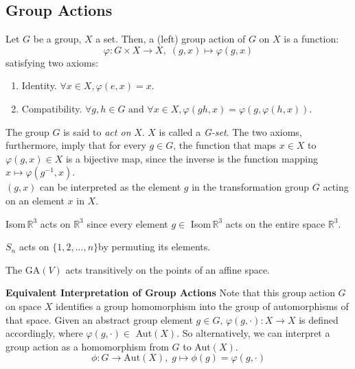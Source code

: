 \documentclass{article}
\begin{document}
  \subsection{Group Actions}

    \begin{definition}
      Let $G$ be a group, $X$ a set. Then, a (left) group action of $G$ on $X$ is a function: 
      \begin{equation}
        \varphi: G \times X \longrightarrow X, \; (g,x) \longmapsto \varphi(g,x)
      \end{equation}
      satisfying two axioms:
      \begin{enumerate}
        \item Identity. $\forall x \in X, \varphi(e, x) = x$. 
        \item Compatibility. $\forall g, h \in G \text{ and } \forall x \in X, \varphi(gh, x) = \varphi(g, \varphi(h, x))$.
      \end{enumerate}
      The group $G$ is said to \textit{act on} $X$. $X$ is called a \textit{G-set}. The two axioms, furthermore, imply that for every $g \in G$, the function that maps $x \in X$ to $ \varphi(g, x) \in X$ is a bijective map, since the inverse is the function mapping $x \mapsto \varphi(g^{-1}, x)$. \\
      $(g, x)$ can be interpreted as the element $g$ in the transformation group $G$ acting on an element $x$ in $X$.
    \end{definition}

    \begin{example}
      Isom$\,\mathbb{R}^{3}$ acts on $\mathbb{R}^{3}$ since every element $g \in$ Isom$\,\mathbb{R}^{3}$ acts on the entire space $\mathbb{R}^{3}$. 
    \end{example}

    \begin{example}
      $S_n$ acts on $\{1, 2, ..., n\}$by permuting its elements.
    \end{example}

    \begin{example}
      The GA$(V)$ acts transitively on the points of an affine space.
    \end{example}

    \textbf{Equivalent Interpretation of Group Actions}
    Note that this group action $G$ on space $X$ identifies a group homomorphism into the group of automorphisms of that space. Given an abstract group element $g \in G$, $\varphi(g, \cdot): X \longrightarrow X$ is defined accordingly, where $\varphi(g, \cdot) \in $ Aut$(X)$. So alternatively, we can interpret a group action as a homomorphism from $G$ to Aut$(X)$. 
    \begin{equation}
      \phi: G \longrightarrow \text{Aut}(X), \; g \mapsto \phi(g) = \varphi(g,\cdot)
    \end{equation}
\end{document}
